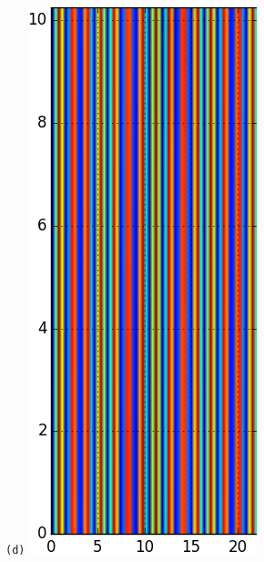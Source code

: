 \documentclass[final,leqno,onefignum,onetabnum]{siamltexmm}
\begin{document}
\begin{figure}[h]
\begin{minipage}{.115\textwidth}
  \end{minipage}
  \begin{minipage}{.115\textwidth}
    \centering \small{\texttt{(d)}}
    \includegraphics[width=\textwidth]{ppo1Fv30_64}

\end{minipage}
\end{figure}
\end{document}
